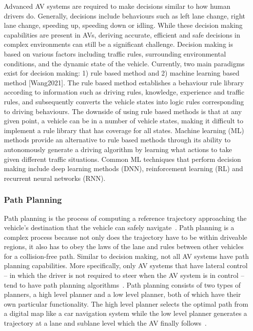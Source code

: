 \documentclass{article}
\begin{document}
Advanced AV systems are required to make decisions similar to how human drivers do\cite{Wang2021}. Generally, decisions include behaviours such as left lane change, right lane change, speeding up, speeding down or idling. While these decision making capabilities are present in AVs,  deriving accurate, efficient and safe decisions in complex environments can still be a significant challenge. Decision making is based on various factors including traffic rules, surrounding environmental conditions, and the dynamic state of the vehicle. Currently, two main paradigms exist for decision making: 1) rule based method and 2) machine learning based method [Wang2021]. The rule based method establishes a behaviour rule library according to information such as driving rules, knowledge, experience and traffic rules, and subsequently converts the vehicle states into logic rules corresponding to driving behaviours. The downside of using rule based methods is that at any given point, a vehicle can be in a number of vehicle states, making it difficult to implement a rule library that has coverage for all states. Machine learning (ML) methods provide an alternative to rule based methods through its ability to autonomously generate a driving algorithm by learning what actions to take given different traffic situations. Common ML techniques that perform decision making include deep learning methods (DNN), reinforcement learning (RL) and recurrent neural networks (RNN).

\subsubsection{Path Planning}

Path planning is the process of computing a reference trajectory approaching the vehicle’s destination that the vehicle can safely navigate~\cite{Ma2012}. Path planning is a complex process because not only does the trajectory have to be within driveable regions, it also has to obey the laws of the lane and rules between other vehicles for a collision-free path.  Similar to decision making, not all AV systems have path planning capabilities. More specifically, only AV systems that have lateral control -- in which the driver is not required to steer when the AV system is in control -- tend to have path planning algorithms~\cite{Wang2021}. Path planning consists of two types of planners, a high level planner and a low level planner, both of which have their own particular functionality. The high level planner selects the optimal path from a digital map like a car navigation system while the low level planner generates a trajectory at a lane and sublane level which the AV finally follows~\cite{Naoki2014}.
\end{document}
